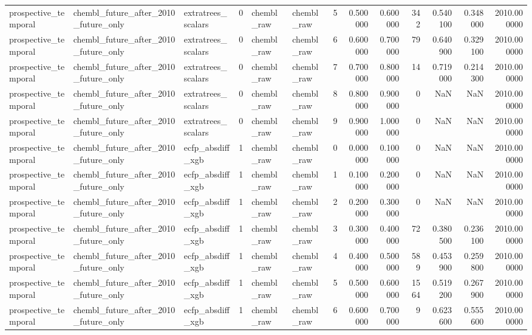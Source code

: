 \begin{longtable}{lllrllrrrrrrr}
prospective\_temporal & chembl\_future\_after\_2010\_future\_only & extratrees\_scalars & 0 & chembl\_raw & chembl\_raw & 5 & 0.500000 & 0.600000 & 342 & 0.540100 & 0.348000 & 2010.000000 \\
prospective\_temporal & chembl\_future\_after\_2010\_future\_only & extratrees\_scalars & 0 & chembl\_raw & chembl\_raw & 6 & 0.600000 & 0.700000 & 79 & 0.640900 & 0.329100 & 2010.000000 \\
prospective\_temporal & chembl\_future\_after\_2010\_future\_only & extratrees\_scalars & 0 & chembl\_raw & chembl\_raw & 7 & 0.700000 & 0.800000 & 14 & 0.719000 & 0.214300 & 2010.000000 \\
prospective\_temporal & chembl\_future\_after\_2010\_future\_only & extratrees\_scalars & 0 & chembl\_raw & chembl\_raw & 8 & 0.800000 & 0.900000 & 0 & NaN & NaN & 2010.000000 \\
prospective\_temporal & chembl\_future\_after\_2010\_future\_only & extratrees\_scalars & 0 & chembl\_raw & chembl\_raw & 9 & 0.900000 & 1.000000 & 0 & NaN & NaN & 2010.000000 \\
prospective\_temporal & chembl\_future\_after\_2010\_future\_only & ecfp\_absdiff\_xgb & 1 & chembl\_raw & chembl\_raw & 0 & 0.000000 & 0.100000 & 0 & NaN & NaN & 2010.000000 \\
prospective\_temporal & chembl\_future\_after\_2010\_future\_only & ecfp\_absdiff\_xgb & 1 & chembl\_raw & chembl\_raw & 1 & 0.100000 & 0.200000 & 0 & NaN & NaN & 2010.000000 \\
prospective\_temporal & chembl\_future\_after\_2010\_future\_only & ecfp\_absdiff\_xgb & 1 & chembl\_raw & chembl\_raw & 2 & 0.200000 & 0.300000 & 0 & NaN & NaN & 2010.000000 \\
prospective\_temporal & chembl\_future\_after\_2010\_future\_only & ecfp\_absdiff\_xgb & 1 & chembl\_raw & chembl\_raw & 3 & 0.300000 & 0.400000 & 72 & 0.380500 & 0.236100 & 2010.000000 \\
prospective\_temporal & chembl\_future\_after\_2010\_future\_only & ecfp\_absdiff\_xgb & 1 & chembl\_raw & chembl\_raw & 4 & 0.400000 & 0.500000 & 589 & 0.453900 & 0.259800 & 2010.000000 \\
prospective\_temporal & chembl\_future\_after\_2010\_future\_only & ecfp\_absdiff\_xgb & 1 & chembl\_raw & chembl\_raw & 5 & 0.500000 & 0.600000 & 1564 & 0.519200 & 0.267900 & 2010.000000 \\
prospective\_temporal & chembl\_future\_after\_2010\_future\_only & ecfp\_absdiff\_xgb & 1 & chembl\_raw & chembl\_raw & 6 & 0.600000 & 0.700000 & 9 & 0.623600 & 0.555600 & 2010.000000 \\

\end{longtable}
